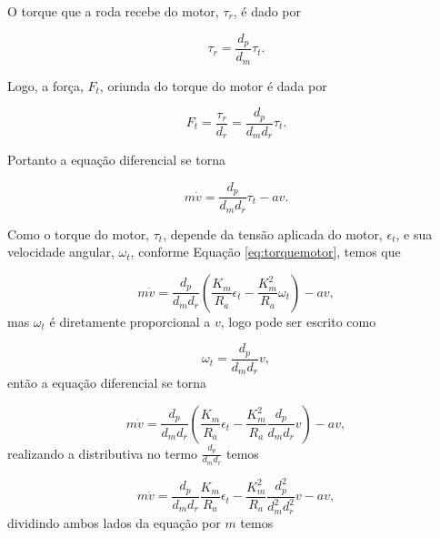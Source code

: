         O torque que a roda recebe do motor, $\tau _r$, é dado por
        
        \begin{equation}
            \tau _r = \frac{d_p}{d_m}\tau _t.
        \end{equation}
        
        Logo, a força, $F_t$, oriunda do torque do motor é dada por
        
        \begin{equation}
            F_t
            = \frac{\tau _r}{d_r}
            = \frac{d_p}{d_m d_r}\tau _t .
        \end{equation}
        
        Portanto a equação diferencial se torna
        
        \begin{equation}
            m\dot v = \frac{d_p}{d_m d_r}\tau _t  - av.
        \end{equation}
        
        Como o torque do motor, $\tau_t$, depende da tensão aplicada do motor, $\epsilon_t$, e sua velocidade angular, $\omega_t$, conforme Equação \eqref{eq:torquemotor}, temos que
        
        \begin{equation}
            m\dot v = \frac{d_p}{d_m d_r} (\frac{K_m}{R_a}\epsilon_t - \frac{K_m^2}{R_a}\omega_t) - av,
        \end{equation}
        mas $\omega_t$ é diretamente proporcional a $v$, logo pode ser escrito como
        
        \begin{equation}
            \omega_t = \frac{d_p}{d_m d_r} v,
        \end{equation}
        então a equação diferencial se torna
        
        \begin{equation}
            m\dot v = \frac{d_p}{d_m d_r} (\frac{K_m}{R_a} \epsilon_t - \frac{K_m^2}{R_a}\frac{d_p}{d_m d_r} v) - av,
        \end{equation}
        realizando a distributiva no termo $\frac{d_p}{d_m d_r}$ temos
        
        \begin{equation}
            m\dot v = \frac{d_p}{d_m d_r} \frac{K_m}{R_a} \epsilon_t - \frac{K_m^2}{R_a} \frac{d_p^2}{d_m^2 d_r^2} v - av,
        \end{equation}
        dividindo ambos lados da equação por $m$ temos
        
